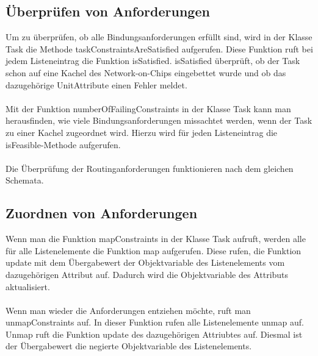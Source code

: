 \subsection{Überprüfen von Anforderungen}
Um zu überprüfen, ob alle Bindungsanforderungen erfüllt sind, wird in der Klasse Task die Methode taskConstraintsAreSatisfied aufgerufen. Diese Funktion ruft bei jedem Listeneintrag die Funktion isSatisfied. isSatisfied überprüft, ob der Task schon auf eine Kachel des Network-on-Chips eingebettet wurde und ob das dazugehörige UnitAttribute einen Fehler meldet.\\
\\
Mit der Funktion numberOfFailingConstraints in der Klasse Task kann man herausfinden, wie viele Bindungsanforderungen missachtet werden, wenn der Task zu einer Kachel zugeordnet wird. Hierzu wird für jeden Listeneintrag die isFeasible-Methode aufgerufen.\\
\\
Die Überprüfung der Routinganforderungen funktionieren nach dem gleichen Schemata.

\subsection{Zuordnen  von Anforderungen}
Wenn man die Funktion mapConstraints in der Klasse Task aufruft, werden alle für alle Listenelemente die Funktion map aufgerufen. Diese rufen, die Funktion update mit dem Übergabewert der Objektvariable des Listenelements vom dazugehörigen Attribut auf. Dadurch wird die Objektvariable des Attributs aktualisiert.\\
\\
Wenn man wieder die Anforderungen entziehen möchte, ruft man unmapConstraints auf. In dieser Funktion rufen alle Listenelemente unmap auf. Unmap ruft die Funktion update  des dazugehörigen Attriubtes auf. Diesmal ist der Übergabewert die negierte Objektvariable des Listenelements.